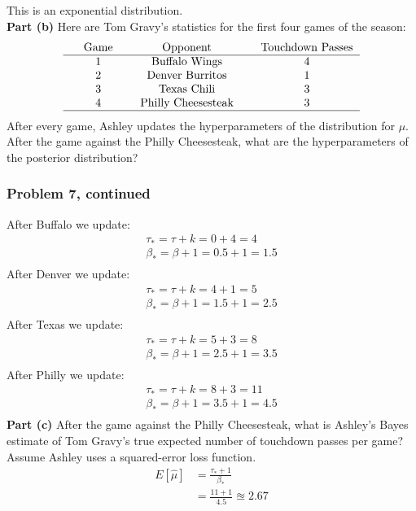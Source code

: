 \documentclass[12pt]{article}
\theoremstyle{definition}
\begin{document}
This is an exponential distribution.\\

\noindent
{\bf Part (b)} Here are Tom Gravy's statistics for the first four games of the season:
$$
\begin{tabular}{ccccccc}
& Game & & Opponent & & Touchdown Passes\\
\hline
& 1 & & Buffalo Wings & & 4\\
& 2 & & Denver Burritos & & 1\\
& 3 & & Texas Chili & & 3\\
& 4 & & Philly Cheesesteak & & 3\\
\hline
\end{tabular}
$$
After every game, Ashley updates the hyperparameters of the distribution for $\mu$. After the game against the Philly Cheesesteak, what are the hyperparameters of the posterior distribution?
 
\newpage
\subsubsection*{Problem 7, continued}

After Buffalo we update:
\begin{align*}
\tau_* = \tau + k = 0 + 4 = 4\\
\beta_* = \beta + 1 = 0.5 + 1 = 1.5\\
\end{align*}
After Denver we update:
\begin{align*}
\tau_* = \tau + k = 4 + 1 = 5\\
\beta_* = \beta + 1 = 1.5 + 1 = 2.5\\
\end{align*}
After Texas we update:
\begin{align*}
\tau_* = \tau + k = 5 + 3 = 8\\
\beta_* = \beta + 1 = 2.5 + 1 = 3.5\\
\end{align*}
After Philly we update:
\begin{align*}
\tau_* = \tau + k = 8 + 3 = 11\\
\beta_* = \beta + 1 = 3.5 + 1 = 4.5\\
\end{align*}
\noindent
{\bf Part (c)} After the game against the Philly Cheesesteak, what is Ashley's Bayes estimate of Tom Gravy's true expected number of touchdown passes per game? Assume Ashley uses a squared-error loss function.
\begin{align*}
E[\hat{\mu}] &= \frac{\tau_* + 1}{\beta_*}\\
&= \frac{11 + 1}{4.5} \approxeq 2.67
\end{align*}
\end{document}
